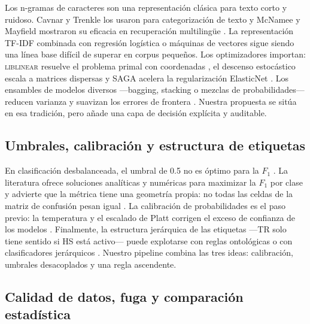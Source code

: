 Los n-gramas de caracteres son una representación clásica para texto corto y
ruidoso. Cavnar y Trenkle los usaron para categorización de texto
\cite{cavnar1994ngram} y McNamee y Mayfield mostraron su eficacia en
recuperación multilingüe \cite{mcnamee2004character}. La representación
TF-IDF \cite{salton1988term} combinada con regresión logística o máquinas
de vectores sigue siendo una línea base difícil de superar en corpus
pequeños. Los optimizadores importan: \textsc{liblinear} resuelve el problema
primal con coordenadas \cite{fan2008liblinear}, el descenso estocástico
escala a matrices dispersas \cite{bottou2010large} y SAGA acelera la
regularización ElasticNet \cite{defazio2014saga,zou2005regularization}. Los
ensambles de modelos diversos ---bagging, stacking o mezclas de
probabilidades--- reducen varianza y suavizan los errores de frontera
\cite{breiman1996bagging,wolpert1992stacked}. Nuestra propuesta se sitúa en
esa tradición, pero añade una capa de decisión explícita y auditable.

\subsection{Umbrales, calibración y estructura de etiquetas}

En clasificación desbalanceada, el umbral de 0.5 no es óptimo para la $F_1$
\cite{japkowicz2002class,lipton2014thresholding}. La literatura ofrece
soluciones analíticas y numéricas para maximizar la $F_1$ por clase
\cite{nan2012optimizing,dembczynski2013optimizing,parambath2014optimizing,berger2020threshold}
y advierte que la métrica tiene una geometría propia: no todas las celdas de
la matriz de confusión pesan igual \cite{flach2003geometry,saito2015precision}.
La calibración de probabilidades es el paso previo: la temperatura y el
escalado de Platt corrigen el exceso de confianza de los modelos
\cite{guo2017calibration,platt1999probabilistic}. Finalmente, la estructura
jerárquica de las etiquetas ---TR solo tiene sentido si HS está activo---
puede explotarse con reglas ontológicas o con clasificadores jerárquicos
\cite{silla2011survey,fortuna2019hierarchically}. Nuestro pipeline combina
las tres ideas: calibración, umbrales desacoplados y una regla ascendente.

\subsection{Calidad de datos, fuga y comparación estadística}

